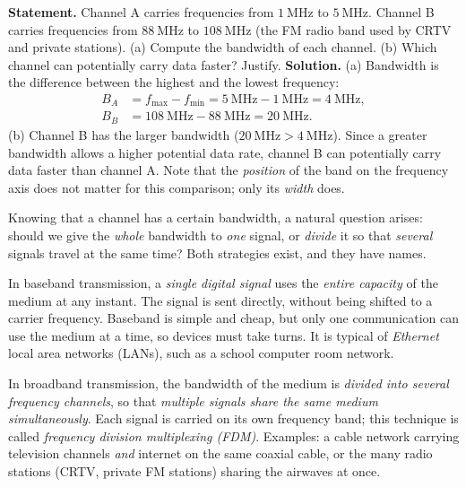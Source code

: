 \documentclass[11pt]{article}
\newcommand{\cle}[1]{{\popxbold\color{popdark}#1}}
\newcounter{popsec}
\newcounter{popsub}
\newcommand{\courssub}[1]{%
  \stepcounter{popsub}%
  \par\vspace{9pt}\noindent{\popxbold\fontsize{11.5}{13}\selectfont\color{popink}{\color{poporange}\thepopsec.\thepopsub}\hspace{6pt}#1}\par\nopagebreak\vspace{4pt}
}
\begin{document}
\begin{exoresolu}
\textbf{Statement.} Channel A carries frequencies from $1\ \mathrm{MHz}$ to $5\ \mathrm{MHz}$. Channel B carries frequencies from $88\ \mathrm{MHz}$ to $108\ \mathrm{MHz}$ (the FM radio band used by CRTV and private stations). (a) Compute the bandwidth of each channel. (b) Which channel can potentially carry data faster? Justify.
\tcblower
\textbf{Solution.}
(a) Bandwidth is the difference between the highest and the lowest frequency:
\begin{align*}
B_A &= f_{\max} - f_{\min} = 5\ \mathrm{MHz} - 1\ \mathrm{MHz} = 4\ \mathrm{MHz},\\
B_B &= 108\ \mathrm{MHz} - 88\ \mathrm{MHz} = 20\ \mathrm{MHz}.
\end{align*}
(b) Channel B has the larger bandwidth ($20\ \mathrm{MHz} > 4\ \mathrm{MHz}$). Since a greater bandwidth allows a higher potential data rate, channel B can potentially carry data faster than channel A. Note that the \emph{position} of the band on the frequency axis does not matter for this comparison; only its \emph{width} does.
\end{exoresolu}

\courssub{Baseband and Broadband Transmission}

Knowing that a channel has a certain bandwidth, a natural question arises: should we give the \emph{whole} bandwidth to \emph{one} signal, or \emph{divide} it so that \emph{several} signals travel at the same time? Both strategies exist, and they have names.

\begin{definition}
In \cle{baseband transmission}, a \emph{single digital signal} uses the \emph{entire capacity} of the medium at any instant. The signal is sent directly, without being shifted to a carrier frequency. Baseband is simple and cheap, but only one communication can use the medium at a time, so devices must take turns. It is typical of \emph{Ethernet} local area networks (LANs), such as a school computer room network.
\end{definition}

\begin{definition}
In \cle{broadband transmission}, the bandwidth of the medium is \emph{divided into several frequency channels}, so that \emph{multiple signals share the same medium simultaneously}. Each signal is carried on its own frequency band; this technique is called \emph{frequency division multiplexing (FDM)}. Examples: a cable network carrying television channels \emph{and} internet on the same coaxial cable, or the many radio stations (CRTV, private FM stations) sharing the airwaves at once.
\end{definition}
\end{document}
